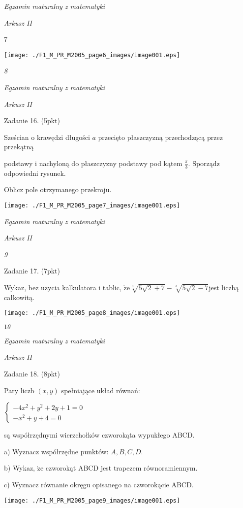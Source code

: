 \documentclass[a4paper,12pt]{article}
\begin{document}
{\it Egzamin maturalny z matematyki}

{\it Arkusz II}

7
\begin{center}
\texttt{[image: ./F1\_M\_PR\_M2005\_page6\_images/image001.eps]}
\end{center}




{\it 8}

{\it Egzamin maturalny z matematyki}

{\it Arkusz II}

Zadanie 16. (5pkt)

Sześcian o krawędzi długości $a$ przecięto płaszczyzną przechodzącą przez przekątną

podstawy i nachyloną do płaszczyzny podstawy pod kątem $\displaystyle \frac{\pi}{3}$. Sporządz$\acute{}$ odpowiedni rysunek.

Oblicz pole otrzymanego przekroju.
\begin{center}
\texttt{[image: ./F1\_M\_PR\_M2005\_page7\_images/image001.eps]}
\end{center}




{\it Egzamin maturalny z matematyki}

{\it Arkusz II}

{\it 9}

Zadanie 17. (7pkt)

Wykaz, bez uzycia kalkulatora i tablic, $\dot{\mathrm{z}}\mathrm{e}\sqrt[3]{5\sqrt{2}+7}-\sqrt[3]{5\sqrt{2}-7}$jest liczbą całkowitą.
\begin{center}
\texttt{[image: ./F1\_M\_PR\_M2005\_page8\_images/image001.eps]}
\end{center}




$ 1\theta$

{\it Egzamin maturalny z matematyki}

{\it Arkusz II}

Zadanie 18. (8pkt)

Pary liczb $(x,y)$ spełniające układ równań:

$\left\{\begin{array}{l}
-4x^{2}+y^{2}+2y+1=0\\
-x^{2}+y+4=0
\end{array}\right.$

są współrzędnymi wierzchołków czworokąta wypukłego ABCD.

a) Wyznacz współrzędne punktów: $A, B, C, D.$

b) Wykaz, $\dot{\mathrm{z}}\mathrm{e}$ czworokąt ABCD jest trapezem równoramiennym.

c) Wyznacz równanie okręgu opisanego na czworokącie ABCD.
\begin{center}
\texttt{[image: ./F1\_M\_PR\_M2005\_page9\_images/image001.eps]}
\end{center}
\end{document}
